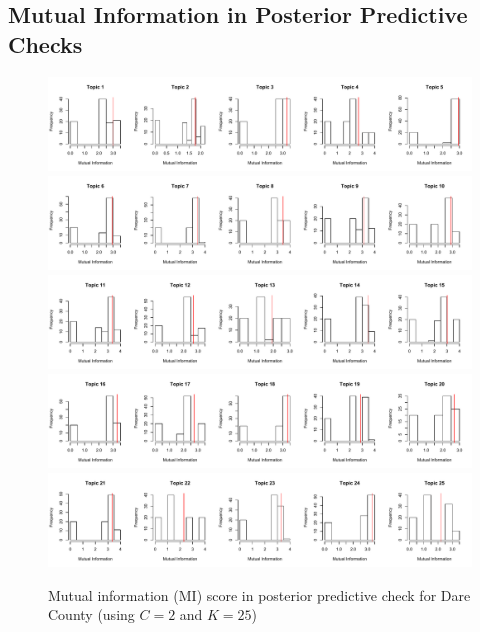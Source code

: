                    \subsection{Mutual Information in Posterior Predictive Checks}\label{subsec:MI_PPC}        
                   \begin{figure}[ht]
                   	\centering
                   	\includegraphics[width=1\textwidth]{plots/MI1.pdf}  
                   	                   	\includegraphics[width=1\textwidth]{plots/MI2.pdf}  
                   	            \includegraphics[width=1\textwidth]{plots/MI3.pdf}  
          	\includegraphics[width=1\textwidth]{plots/MI4.pdf}  
                \includegraphics[width=1\textwidth]{plots/MI5.pdf}  
                   	\label{fig:DareMI}
                   	\caption{Mutual information (MI) score in posterior predictive check for Dare County (using $C=2$ and $K=25$) }
                   \end{figure}
